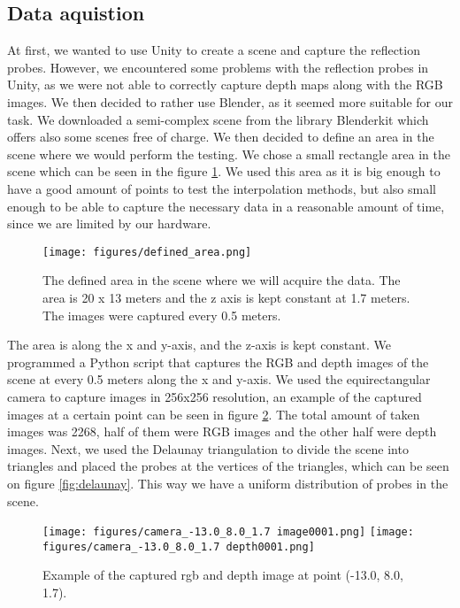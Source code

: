 \subsection{Data aquistion}
At first, we wanted to use Unity to create a scene and capture the reflection probes. However, we encountered some problems with the reflection probes in Unity, as we were not able to correctly capture depth maps along with the RGB images.
We then decided to rather use Blender, as it seemed more suitable for our task. We downloaded a semi-complex scene \cite{BlenderKit} from the library Blenderkit which offers also some scenes free of charge. We then decided to define an area in the scene where we would perform the testing.
We chose a small rectangle area in the scene which can be seen in the figure \ref{fig:defined_area}. We used this area as it is big enough to have a good amount of points to test the interpolation methods, but also small enough to be able to capture the necessary data in a reasonable amount of time, since we are limited by our hardware.

\begin{figure}[htb]
    \centering
    \texttt{[image: figures/defined\_area.png]}

    \caption{The defined area in the scene where we will acquire the data. The area is 20 x 13 meters and the z axis is kept constant at 1.7 meters. The images were captured every 0.5 meters.}
    \label{fig:defined_area}
\end{figure}

The area is along the x and y-axis, and the z-axis is kept constant. 
We programmed a Python script that captures the RGB and depth images of the scene at every 0.5 meters along the x and y-axis.
We used the equirectangular camera to capture images in 256x256 resolution, an example of the captured images at a certain point can be seen in figure \ref{fig:example_scene}. 
The total amount of taken images was 2268, half of them were RGB images and the other half were depth images. 
Next, we used the Delaunay triangulation to divide the scene into triangles and placed the probes at the vertices of the triangles, which can be seen on figure \ref{fig:delaunay}.
This way we have a uniform distribution of probes in the scene.

\begin{figure}[htb]
    \centering
    \texttt{[image: figures/camera\_-13.0\_8.0\_1.7 image0001.png]}
    \texttt{[image: figures/camera\_-13.0\_8.0\_1.7 depth0001.png]}
    
    \caption{Example of the captured rgb and depth image at point (-13.0, 8.0, 1.7).}
    \label{fig:example_scene}
\end{figure}



